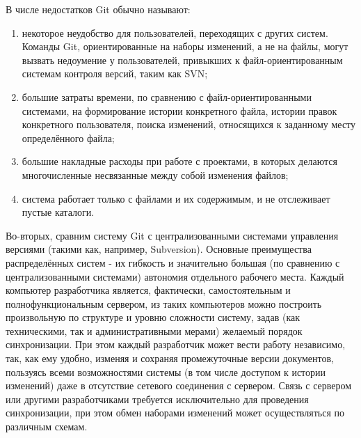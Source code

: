\documentclass[a4paper,14pt]{report} %
\begin{document}
В числе недостатков Git обычно называют:
\begin{enumerate} %
\item некоторое неудобство для пользователей, переходящих с других систем. Команды Git, ориентированные на наборы изменений, а не на файлы, могут вызвать недоумение у пользователей, привыкших к файл-ориентированным системам контроля версий, таким как SVN;
\item большие затраты времени, по сравнению с файл-ориентированными системами, на формирование истории конкретного файла, истории правок конкретного пользователя, поиска изменений, относящихся к заданному месту определённого файла;
\item большие накладные расходы при работе с проектами, в которых делаются многочисленные несвязанные между собой изменения файлов;
\item система работает только с файлами и их содержимым, и не отслеживает пустые каталоги.
\end{enumerate}

Во-вторых, сравним систему Git с централизованными системами управления версиями (такими как, например, Subversion).
Основные преимущества распределённых систем - их гибкость и значительно большая (по сравнению с централизованными системами) автономия отдельного рабочего места. Каждый компьютер разработчика является, фактически, самостоятельным и полнофункциональным сервером, из таких компьютеров можно построить произвольную по структуре и уровню сложности систему, задав (как техническими, так и административными мерами) желаемый порядок синхронизации. При этом каждый разработчик может вести работу независимо, так, как ему удобно, изменяя и сохраняя промежуточные версии документов, пользуясь всеми возможностями системы (в том числе доступом к истории изменений) даже в отсутствие сетевого соединения с сервером. Связь с сервером или другими разработчиками требуется исключительно для проведения синхронизации, при этом обмен наборами изменений может осуществляться по различным схемам.
\end{document}

